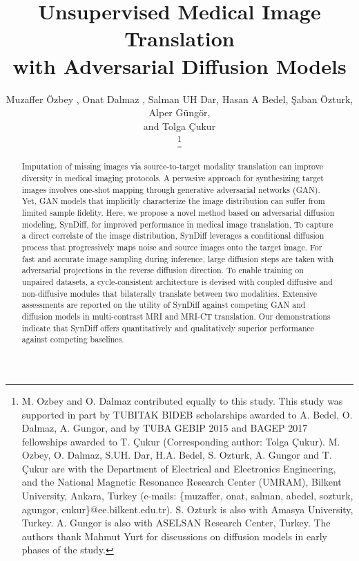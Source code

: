 \documentclass[journal,twoside,web]{ieeecolor}
\begin{document}
\title{Unsupervised Medical Image Translation \\with Adversarial Diffusion Models}
\author{Muzaffer \"Ozbey , Onat Dalmaz , Salman UH Dar, Hasan A Bedel, \c{S}aban \"Ozturk, Alper G\"ung\"or,\\ and Tolga \c{C}ukur
\vspace{-1.25cm}
\\
\thanks{ M. Ozbey and O. Dalmaz contributed equally to this study.
This study was supported in part by TUBITAK BIDEB scholarships awarded to A. Bedel, O. Dalmaz, A. Gungor, and by TUBA GEBIP 2015 and BAGEP 2017 fellowships awarded to T. \c{C}ukur  (Corresponding author: Tolga \c{C}ukur).  M. Ozbey, O. Dalmaz, S.UH. Dar, H.A. Bedel, S. Ozturk, A. Gungor and T. \c{C}ukur are with the Department of Electrical and Electronics Engineering, and the National Magnetic Resonance Research Center (UMRAM), Bilkent University, Ankara, Turkey (e-mails: \{muzaffer, onat, salman, abedel, sozturk, agungor, cukur\}@ee.bilkent.edu.tr). S. Ozturk is also with Amasya University, Turkey. A. Gungor is also with ASELSAN Research Center, Turkey. The authors thank Mahmut Yurt for discussions on diffusion models in early phases of the study.}
}

\maketitle
\begin{abstract}
Imputation of missing images via source-to-target modality translation can improve diversity in medical imaging protocols. A pervasive approach for synthesizing target images involves one-shot mapping through generative adversarial networks (GAN). Yet, GAN models that implicitly characterize the image distribution can suffer from limited sample fidelity. Here, we propose a novel method based on adversarial diffusion modeling, SynDiff, for improved performance in medical image translation. To capture a direct correlate of the image distribution, SynDiff leverages a conditional diffusion process that progressively maps noise and source images onto the target image. For fast and accurate image sampling during inference, large diffusion steps are taken with adversarial projections in the reverse diffusion direction. To enable training on unpaired datasets, a cycle-consistent architecture is devised with coupled diffusive and non-diffusive modules that bilaterally translate between two modalities. Extensive assessments are reported on the utility of SynDiff against competing GAN and diffusion models in multi-contrast MRI and MRI-CT translation. Our demonstrations indicate that SynDiff offers quantitatively and qualitatively superior performance against competing baselines. 

\end{abstract}
\end{document}
